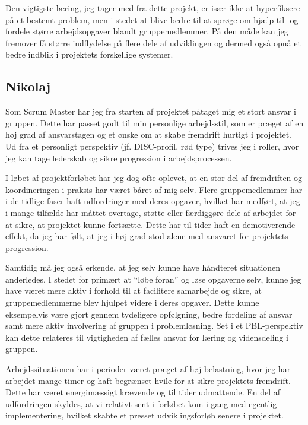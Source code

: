 Den vigtigste læring, jeg tager med fra dette projekt, er især ikke at hyperfiksere på et bestemt problem, men i stedet at blive bedre til at sprøge om hjælp til- og fordele større arbejdsopgaver blandt gruppemedlemmer. På den måde kan jeg fremover få større indflydelse på flere dele af udviklingen og dermed også opnå et bedre indblik i projektets forskellige systemer.
\newpage

\subsection{Nikolaj}
Som Scrum Master har jeg fra starten af projektet påtaget mig et stort ansvar i gruppen. Dette har passet godt til min personlige arbejdsstil, som er præget af en høj grad af ansvarstagen og et ønske om at skabe fremdrift hurtigt i projektet. Ud fra et personligt perspektiv (jf. DISC-profil, rød type) trives jeg i roller, hvor jeg kan tage lederskab og sikre progression i arbejdsprocessen.

I løbet af projektforløbet har jeg dog ofte oplevet, at en stor del af fremdriften og koordineringen i praksis har været båret af mig selv. Flere gruppemedlemmer har i de tidlige faser haft udfordringer med deres opgaver, hvilket har medført, at jeg i mange tilfælde har måttet overtage, støtte eller færdiggøre dele af arbejdet for at sikre, at projektet kunne fortsætte. Dette har til tider haft en demotiverende effekt, da jeg har følt, at jeg i høj grad stod alene med ansvaret for projektets progression.

Samtidig må jeg også erkende, at jeg selv kunne have håndteret situationen anderledes. I stedet for primært at “løbe foran” og løse opgaverne selv, kunne jeg have været mere aktiv i forhold til at facilitere samarbejde og sikre, at gruppemedlemmerne blev hjulpet videre i deres opgaver. Dette kunne eksempelvis være gjort gennem tydeligere opfølgning, bedre fordeling af ansvar samt mere aktiv involvering af gruppen i problemløsning. Set i et PBL-perspektiv kan dette relateres til vigtigheden af fælles ansvar for læring og vidensdeling i gruppen.

Arbejdssituationen har i perioder været præget af høj belastning, hvor jeg har arbejdet mange timer og haft begrænset hvile for at sikre projektets fremdrift. Dette har været energimæssigt krævende og til tider udmattende. En del af udfordringen skyldes, at vi relativt sent i forløbet kom i gang med egentlig implementering, hvilket skabte et presset udviklingsforløb senere i projektet.

